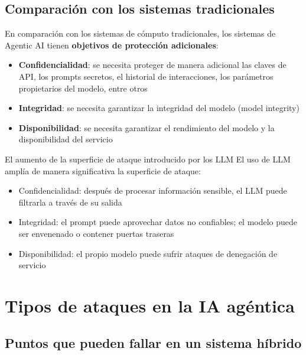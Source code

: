 \documentclass[a4paper]{article}
\begin{document}
\subsection{Comparación con los sistemas tradicionales}

En comparación con los sistemas de cómputo tradicionales, los sistemas de Agentic AI tienen \textbf{objetivos de protección adicionales}:
\begin{itemize}
    \item \textbf{Confidencialidad}: se necesita proteger de manera adicional las claves de API, los prompts secretos, el historial de interacciones, los parámetros propietarios del modelo, entre otros
    \item \textbf{Integridad}: se necesita garantizar la integridad del modelo (model integrity)
    \item \textbf{Disponibilidad}: se necesita garantizar el rendimiento del modelo y la disponibilidad del servicio
\end{itemize}

\begin{warningbox}{El aumento de la superficie de ataque introducido por los LLM}
El uso de LLM amplía de manera significativa la superficie de ataque:
\begin{itemize}
    \item Confidencialidad: después de procesar información sensible, el LLM puede filtrarla a través de su salida
    \item Integridad: el prompt puede aprovechar datos no confiables; el modelo puede ser envenenado o contener puertas traseras
    \item Disponibilidad: el propio modelo puede sufrir ataques de denegación de servicio
\end{itemize}
\end{warningbox}

\section{Tipos de ataques en la IA agéntica}

\subsection{Puntos que pueden fallar en un sistema híbrido}
\end{document}
